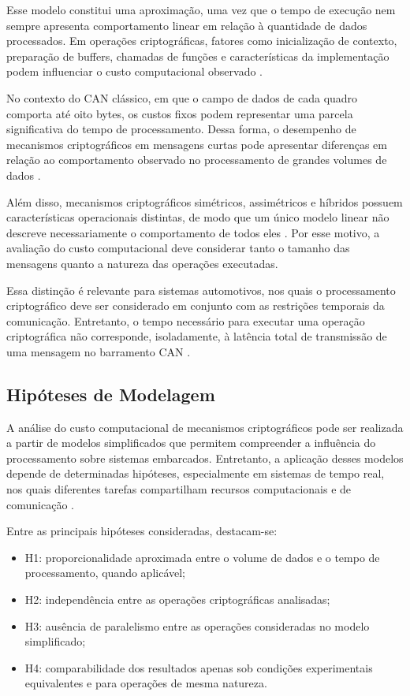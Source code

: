 Esse modelo constitui uma aproximação, uma vez que o tempo de execução nem sempre apresenta comportamento linear em relação à quantidade de dados processados. Em operações criptográficas, fatores como inicialização de contexto, preparação de buffers, chamadas de funções e características da implementação podem influenciar o custo computacional observado \cite{games1996benchmarking}.

No contexto do CAN clássico, em que o campo de dados de cada quadro comporta até oito bytes, os custos fixos podem representar uma parcela significativa do tempo de processamento. Dessa forma, o desempenho de mecanismos criptográficos em mensagens curtas pode apresentar diferenças em relação ao comportamento observado no processamento de grandes volumes de dados \cite{pinho2001timing,manifavas2013lightweight}.

Além disso, mecanismos criptográficos simétricos, assimétricos e híbridos possuem características operacionais distintas, de modo que um único modelo linear não descreve necessariamente o comportamento de todos eles \cite{rfc8017,rfc9180}. Por esse motivo, a avaliação do custo computacional deve considerar tanto o tamanho das mensagens quanto a natureza das operações executadas.

Essa distinção é relevante para sistemas automotivos, nos quais o processamento criptográfico deve ser considerado em conjunto com as restrições temporais da comunicação. Entretanto, o tempo necessário para executar uma operação criptográfica não corresponde, isoladamente, à latência total de transmissão de uma mensagem no barramento CAN \cite{schutze2011automotive}.

\subsection{Hipóteses de Modelagem}

A análise do custo computacional de mecanismos criptográficos pode ser realizada a partir de modelos simplificados que permitem compreender a influência do processamento sobre sistemas embarcados. Entretanto, a aplicação desses modelos depende de determinadas hipóteses, especialmente em sistemas de tempo real, nos quais diferentes tarefas compartilham recursos computacionais e de comunicação \cite{burns2001real,thiele2004design}.

Entre as principais hipóteses consideradas, destacam-se:

\begin{itemize}
    \item H1: proporcionalidade aproximada entre o volume de dados e o tempo de processamento, quando aplicável;
    \item H2: independência entre as operações criptográficas analisadas;
    \item H3: ausência de paralelismo entre as operações consideradas no modelo simplificado;
    \item H4: comparabilidade dos resultados apenas sob condições experimentais equivalentes e para operações de mesma natureza.
\end{itemize}

